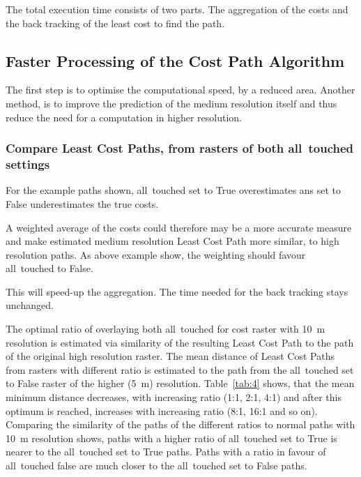 The total execution time consists of two parts. 
The aggregation of the costs and the back tracking of the least cost to find the path.


\subsection{Faster Processing of the Cost Path Algorithm}\label{subsec:faster-processing-of-the-cost-path-algorithm}

The first step is to optimise the computational speed, by a reduced area.
Another method, is to improve the prediction of the medium resolution itself and thus reduce the need for a computation in higher resolution.

\subsubsection{Compare Least Cost Paths, from rasters of both all~touched settings}

For the example paths shown, all~touched set to True overestimates ans set to False underestimates the true costs.

A weighted average of the costs could therefore may be a more accurate measure and make estimated medium resolution Least Cost Path more similar, to high resolution paths.
As above example show, the weighting should favour all~touched to False.

This will speed-up the aggregation.
The time needed for the back tracking stays unchanged.

The optimal ratio of overlaying both all~touched for cost raster with 10~m resolution is estimated via similarity of the resulting Least Cost Path to the path of the original high resolution raster. 
The mean distance of Least Cost Paths from rasters with different ratio is estimated to the path from the all~touched set to False raster of the higher (5~m) resolution. 
Table~\ref{tab:4} shows, that the mean minimum distance decreases, with increasing ratio (1:1, 2:1, 4:1) and after this optimum is reached, increases with increasing ratio (8:1, 16:1 and so on).
Comparing  the similarity of the paths of the different ratios to normal paths with 10~m resolution shows, paths with a higher ratio of all~touched set to True is nearer to the all~touched set to True paths.
Paths with a ratio in favour of all~touched false are much closer to the all~touched set to False paths.


